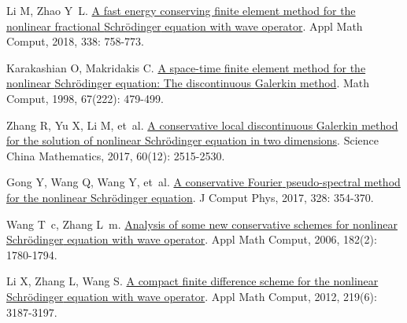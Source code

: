 \begin{thebibliography}{77}
    Li M, Zhao Y~L.
    \newblock \href{https://linkinghub.elsevier.com/retrieve/pii/S0096300318304983}{A fast energy conserving finite element method for the nonlinear fractional {{Schr{\"o}dinger}} equation with wave operator}\allowbreak[J].
    \newblock Appl Math Comput, 2018, 338: 758-773.
    
    Karakashian O, Makridakis C.
    \newblock \href{https://www.ams.org/mcom/1998-67-222/S0025-5718-98-00946-6/}{A space-time finite element method for the nonlinear {{Schr{\"o}dinger}} equation: The discontinuous {{Galerkin}} method}\allowbreak[J].
    \newblock Math Comput, 1998, 67\allowbreak (222): 479-499.
    
    Zhang R, Yu X, Li M, et~al.
    \newblock \href{https://doi.org/10.1007/s11425-016-9118-x}{A conservative local discontinuous {{Galerkin}} method for the solution of nonlinear {{Schr{\"o}dinger}} equation in two dimensions}\allowbreak[J].
    \newblock Science China Mathematics, 2017, 60\allowbreak (12): 2515-2530.
    
    Gong Y, Wang Q, Wang Y, et~al.
    \newblock \href{https://www.sciencedirect.com/science/article/pii/S0021999116305204}{A conservative {{Fourier}} pseudo-spectral method for the nonlinear {{Schr{\"o}dinger}} equation}\allowbreak[J].
    \newblock J Comput Phys, 2017, 328: 354-370.
    
    Wang T~c, Zhang L~m.
    \newblock \href{https://linkinghub.elsevier.com/retrieve/pii/S009630030600525X}{Analysis of some new conservative schemes for nonlinear {{Schr{\"o}dinger}} equation with wave operator}\allowbreak[J].
    \newblock Appl Math Comput, 2006, 182\allowbreak (2): 1780-1794.
    
    Li X, Zhang L, Wang S.
    \newblock \href{https://linkinghub.elsevier.com/retrieve/pii/S0096300312009502}{A compact finite difference scheme for the nonlinear {{Schr{\"o}dinger}} equation with wave operator}\allowbreak[J].
    \newblock Appl Math Comput, 2012, 219\allowbreak (6): 3187-3197.
    

\end{thebibliography}
